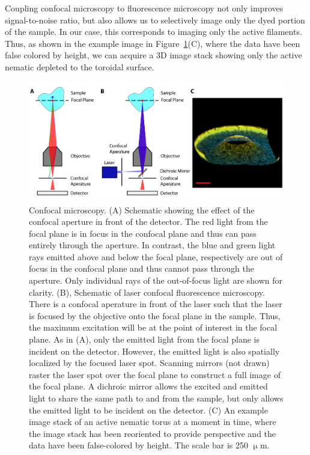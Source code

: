 Coupling confocal microscopy to fluorescence microscopy not only improves signal-to-noise ratio, but also allows us to selectively image only the dyed portion of the sample.
In our case, this corresponds to imaging only the active filaments.
Thus, as shown in the example image in Figure~\ref{f:3-Confocal}(C), where the data have been false colored by height, we can acquire a 3D image stack showing only the active nematic depleted to the toroidal surface.
\begin{figure}
  \centering
  \includegraphics{figures/C3/Ch3-Figs_Confocal.png}
  \caption{Confocal microscopy.
  (A) Schematic showing the effect of the confocal aperture in front of the detector.
  The red light from the focal plane is in focus in the confocal plane and thus can pass entirely through the aperture.
  In contrast, the blue and green light rays emitted above and below the focal plane, respectively are out of focus in the confocal plane and thus cannot pass through the aperture.
  Only individual rays of the out-of-focus light are shown for clarity.
  (B), Schematic of laser confocal fluorescence microscopy.
  There is a confocal aperature in front of the laser such that the laser is focused by the objective onto the focal plane in the sample.
  Thus, the maximum excitation will be at the point of interest in the focal plane.
  As in (A), only the emitted light from the focal plane is incident on the detector.
  However, the emitted light is also spatially localized by the focused laser spot.
  Scanning mirrors (not drawn) raster the laser spot over the focal plane to construct a full image of the focal plane.
  A dichroic mirror allows the excited and emitted light to share the same path to and from the sample, but only allows the emitted light to be incident on the detector.
  (C) An example image stack of an active nematic torus at a moment in time, where the image stack has been reoriented to provide perspective and the data have been false-colored by height.
  The scale bar is 250 $\upmu$m.}\label{f:3-Confocal}
\end{figure}

